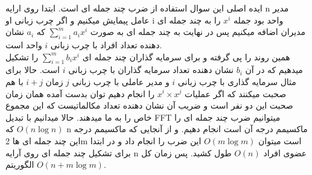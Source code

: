 \problem{}
ایده اصلی این سوال استفاده از ضرب چند جمله ای است.
ابتدا روی ارایه n مدیر عامل پیمایش میکنیم
و اگر چرب زبانی او i واحد بود
جمله  $x^i$ را به چند جمله ای مدیران اضافه میکنیم
پس در نهایت به چند جمله ای به صورت $\sum_{i=1}^{m}{a_i x^i}$
که $a_i$ نشان دهنده تعداد افراد با چرب زبانی $i$ واحد است.
\\
همین روند را پی گرفته و برای سرمایه گذاران چند جمله ای $\sum_{i=1}^{m}{b_i x^i}$ را تشکیل میدهیم
که در آن $b_i$ نشان دهنده تعداد سرمایه گذاران با چرب زبانی $i$ است.
حالا برای مثال سرمایه گذاری با چرب زبانی $i$  و مدیر عاملی با چرب زبانی $j$ 
زمان $i+j$ با هم صحبت میکنند که اگر عملیات
$x^i \times x^j$ را انجام دهیم توان بدست آمده همان زمان صحبت این دو نفر است
و ضریب آن نشان دهنده تعداد مکالماتیست که این مجموع خاص را به ما میدهند.
حالا میدانیم با تبدیل FFT  میتوانیم ضرب چند جمله ای را $O(n\log n)$ که n ماکسیمم درجه
آن است انجام دهیم.
و از آنجایی که ماکسیمم درجه این چند جمله ای ها 2m است
میتوان $O(m\log m)$
این ضرب را انجام داد و در ابتدا برای تشکیل چند جمله ای روی آرایه n 
عضوی افراد $O(n)$ طول کشید.
پس زمان کل الگوریتم $O(n+m\log{m})$.

